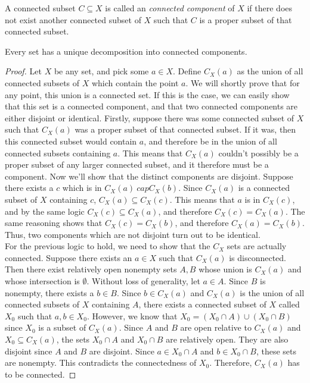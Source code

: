 \begin{definition}
A connected subset $C \subseteq X$ is called an \emph{connected component} of $X$ if there does not exist another connected subset of $X$ such that $C$ is a proper subset of that connected subset.
\end{definition}
\begin{theorem}
Every set has a unique decomposition into connected components.
\end{theorem}
\begin{proof}
Let $X$ be any set, and pick some $a \in X$. Define $C_X(a)$ as the union of all connected subsets of $X$ which contain the point $a$. We will shortly prove that for any point, this union is a connected set. If this is the case, we can easily show that this set is a connected component, and that two connected components are either disjoint or identical. Firstly, suppose there was some connected subset of $X$ such that $C_X(a)$ was a proper subset of that connected subset. If it was, then this connected subset would contain $a$, and therefore be in the union of all connected subsets containing $a$. This means that $C_X(a)$ couldn't possibly be a proper subset of any larger connected subset, and it therefore must be a component. Now we'll show that the distinct components are disjoint. Suppose there exists a $c$ which is in $C_X(a) \ cap C_X(b)$. Since $C_X(a)$ is a connected subset of $X$ containing $c$, $C_X(a) \subseteq C_X(c)$. This means that $a$ is in $C_X(c)$, and by the same logic $C_X(c) \subseteq C_X(a)$, and therefore $C_X(c)=C_X(a)$. The same reasoning shows that $C_X(c) = C_X(b)$, and therefore $C_X(a) = C_X(b)$. Thus, two components which are not disjoint turn out to be identical.\\
For the previous logic to hold, we need to show that the $C_X$ sets are actually connected. Suppose there exists an $a \in X$ such that $C_X(a)$ is disconnected. Then there exist relatively open nonempty sets $A, B$ whose union is $C_X(a)$ and whose intersection is $\emptyset$. Without loss of generality, let $a \in A$. Since $B$ is nonempty, there exists a $b \in B$. Since $b \in C_X(a)$ and $C_X(a)$ is the union of all connected subsets of $X$ containing $A$, there exists a connected subset of $X$ called $X_0$ such that $a, b \in X_0$. However, we know that $X_0 = (X_0 \cap A) \cup (X_0 \cap B)$ since $X_0$ is a subset of $C_X(a)$. Since $A$ and $B$ are open relative to $C_X(a)$ and $X_0 \subseteq C_X(a)$, the sets $X_0 \cap A$ and $X_0 \cap B$ are relatively open. They are also disjoint since $A$ and $B$ are disjoint. Since $a \in X_0 \cap A$ and $b \in X_0 \cap B$, these sets are nonempty. This contradicts the connectedness of $X_0$. Therefore, $C_X(a)$ has to be connected.
\end{proof}
